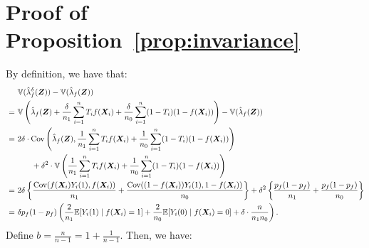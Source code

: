 \documentclass[USenglish,onecolumn]{article}
\DeclareMathOperator\Cov{Cov}
\newcommand\E{\mathbb{E}}
\newcommand\V{\mathbb{V}}
\newcommand\bX{\bm{X}}
\newcommand\bZ{\bm{Z}}
\begin{document}
\section{Proof of Proposition~\ref{prop:invariance}}
\label{app:invariance}
By definition, we have that:
\begin{align*}
& \V(\hat\lambda^\delta_f(\bZ))-\V(\hat\lambda_f(\bZ)) \\
\ = \ &\V\left(\hat\lambda_f(\bZ) + \frac{\delta}{n_1} \sum_{i=1}^n T_if(\bX_i)+ \frac{\delta}{n_0} \sum_{i=1}^n (1-T_i)(1-f(\bX_i))\right) - \V(\hat\lambda_f(\bZ))
  \\
  \ =  \ &2\delta \cdot \Cov\left(\hat\lambda_f(\bZ) , \frac{1}{n_1}
           \sum_{i=1}^n T_if(\bX_i)+ \frac{1}{n_0} \sum_{i=1}^n
           (1-T_i)(1-f(\bX_i))\right) \\
  & \hspace{.25in} + \delta^2 \cdot \V\left(\frac{1}{n_1} \sum_{i=1}^n T_if(\bX_i)+\frac{1}{n_0} \sum_{i=1}^n (1-T_i)(1-f(\bX_i))\right)
\\ = \ &2\delta \left\{\frac{\Cov(f(\bX_i)Y_i(1),f(\bX_i))}{n_1} +
         \frac{\Cov((1-f(\bX_i))Y_i(1),1-f(\bX_i))}{n_0}\right\} + \delta^2 \left\{\frac{p_f(1-p_f)}{n_1}+ \frac{p_f(1-p_f)}{n_0}\right\}
\\ = \ &\delta p_f(1-p_f)\left(\frac{2}{n_1}\E[Y_i(1) \mid
         f(\bX_i)=1]+ \frac{2}{n_0}\E[Y_i(0) \mid f(\bX_i)=0]+
         \delta \cdot \frac{n}{n_1n_0}\right).
\end{align*}
Define $b =\frac{n}{n-1}=1+\frac{1}{n-1}$.  Then, we have:
\end{document}
